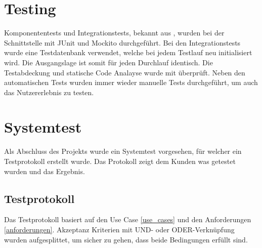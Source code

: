 \section{Testing}
Komponententests und Integrationstests, bekannt aus \cite{test_soft_book}, wurden bei der Schnittstelle mit JUnit und Mockito durchgeführt. Bei den Integrationstests wurde eine 
Testdatenbank verwendet, welche bei jedem Testlauf neu initialisiert wird. Die Ausgangslage ist somit für jeden Durchlauf identisch. Die Testabdeckung und statische Code Analayse wurde 
mit  überprüft. Neben den automatischen Tests wurden immer wieder manuelle Tests durchgeführt, um auch das Nutzererlebnis zu testen.

\section{Systemtest}
Als Abschluss des Projekts wurde ein Systemtest vorgesehen, für welcher ein Testprotokoll erstellt wurde. Das Protokoll zeigt dem Kunden was getestet wurden und das Ergebnis.

\subsection{Testprotokoll}
Das Testprotokoll basiert auf den Use Case \ref{use_cases} und den Anforderungen \ref{anforderungen}. Akzeptanz Kriterien mit UND- oder ODER-Verknüpfung wurden 
aufgesplittet, um sicher zu gehen, dass beide Bedingungen erfüllt sind.


